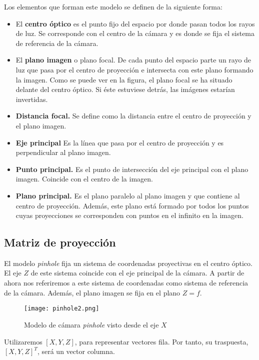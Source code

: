 Los elementos que forman este modelo se definen de la siguiente forma:
\begin{itemize}
\item El \textbf{centro óptico} es el punto fijo del espacio por donde pasan todos los rayos de luz. Se corresponde con el centro de la cámara y es donde se fija el sistema de referencia de la cámara.
\item El \textbf{plano imagen} o plano focal. De cada punto del espacio parte un rayo de luz que pasa por el centro de proyección e intersecta con este plano formando la imagen. Como se puede ver en la figura, el plano focal se ha situado delante del centro óptico. Si éste estuviese detrás, las imágenes estarían invertidas.
\item \textbf{Distancia focal.} Se define como la distancia entre el centro de proyección y el plano imagen.
\item \textbf{Eje principal} Es la línea que pasa por el centro de proyección y es perpendicular al plano imagen.
\item \textbf{Punto principal.} Es el punto de intersección del eje principal con el plano imagen. Coincide con el centro de la imagen.
\item \textbf{Plano principal.} Es el plano paralelo al plano imagen y que contiene al centro de proyección. Además, este plano está formado por todos los puntos cuyas proyecciones se corresponden con puntos en el infinito en la imagen.
\end{itemize}

\subsection{Matriz de proyección}\label{subsec:matproy}
El modelo \textit{pinhole} \cite{Hartley} fija un sistema de coordenadas proyectivas en el centro óptico. El eje $Z$ de este sistema coincide con el eje principal de la cámara. A partir de ahora nos referiremos a este sistema de coordenadas como sistema de referencia de la cámara. Además, el plano imagen se fija en el plano $Z = f$.

\begin{figure}[h]
  \centering
  \texttt{[image: pinhole2.png]}
  \caption{Modelo de cámara \textit{pinhole} visto desde el eje $X$}
  \label{fig:pinholeCamera2}
\end{figure}

Utilizaremos $[X, Y, Z]$, para representar vectores fila. Por tanto, su traspuesta, $[X, Y, Z]^T$, será un vector columna. 

